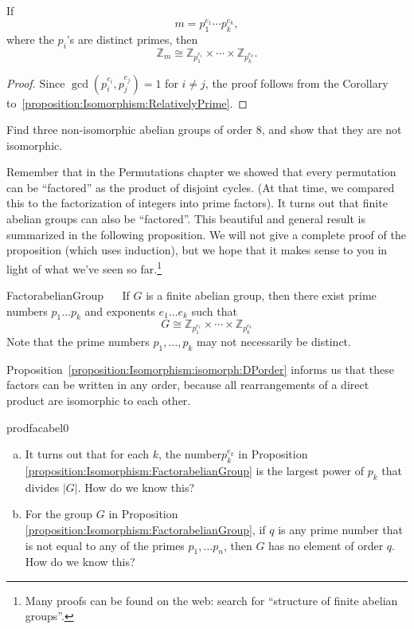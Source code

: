 \begin{corollary}
If
\[
m = p_1^{e_1} \cdots  p_k^{e_k},
\]
where the $p_i$'s are distinct primes, then
\[
{\mathbb Z}_m \cong {\mathbb Z}_{p_1^{e_1}} \times \cdots \times {\mathbb
Z}_{p_k^{e_k}}.
\]
\end{corollary}
 
 
\begin{proof}
Since  $\gcd(p_i^{e_i},p_j^{e_j}) = 1$ for $i \neq j$, the proof follows from the Corollary to~\ref{proposition:Isomorphism:RelativelyPrime}.
\end{proof}

\begin{exercise}{}
Find three non-isomorphic abelian groups of order 8, and show that they are not isomorphic.
\end{exercise}


Remember that in the Permutations chapter we showed that every permutation can be ``factored''  as the product of disjoint cycles. (At that time, we compared this to the factorization of integers into prime factors).  It turns out that finite abelian groups can also be ``factored''.  This beautiful and general result is summarized in the following proposition. We will not give a complete proof of the proposition (which uses induction), but we hope that it makes sense to you in light of what we've seen so far.\footnote{Many proofs can be found on the web: search for ``structure of finite abelian groups''.}

\begin{prop}{FactorabelianGroup} ~~
If $G$ is a finite abelian group, then there exist prime numbers $p_1 \ldots p_k$ and exponents $e_1 \ldots e_k$ such that
\[
G \cong {\mathbb Z}_{p_1^{e_1}} \times \cdots \times {\mathbb
Z}_{p_k^{e_k}}
\]
Note that the prime numbers $p_1, \ldots, p_k$  may not necessarily be distinct.
\end{prop}

\begin{rem}  Proposition~\ref{proposition:Isomorphism:isomorph:DPorder} informs us that these factors can be written in any order, because all rearrangements of a direct product are isomorphic to each other.
\end{rem}


\begin{exercise}{prodfacabel0}
\begin{enumerate}[(a)]
\item
It turns out that for each $k$, the number$ p_k^{e_k}$  in Proposition~ \ref{proposition:Isomorphism:FactorabelianGroup}  is the largest power of $p_k$ that divides $|G|$.  How do we know this?
\item
For the group $G$ in Proposition~ \ref{proposition:Isomorphism:FactorabelianGroup}, if $q$ is any prime number that is not equal to any of the primes $p_1, \ldots p_n$, then $G$ has no element of order $q$.  How do we know this?
\end{enumerate}
\end{exercise}

